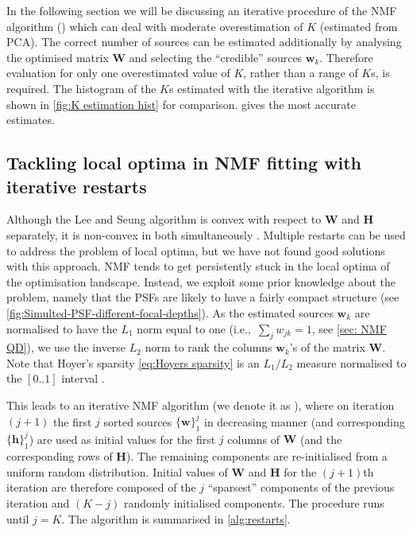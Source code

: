 In the following section we will be discussing an iterative procedure of the NMF algorithm (\inmf{}) which can deal with moderate overestimation of $K$  (estimated from PCA). The correct number of sources can be estimated additionally by analysing the optimised matrix $\bm{W}$ and selecting the ``credible'' sources $\bm{w}_k$. Therefore evaluation for only one overestimated value of $K$, rather than a range of $K$s, is required. The histogram of the $K$s estimated with the iterative algorithm is shown in  \autoref{fig:K estimation hist}\ddd{} for comparison. \inmf{} gives the most accurate estimates. 
\afterpage{\clearpage}

\subsection{Tackling local optima in NMF fitting with iterative restarts \label{sub: Iterative restarts}}

Although the Lee and Seung algorithm is convex with respect to $\bm{W}$ and $\bm{H}$ separately, it is non-convex in both simultaneously \cite{Lee2001}. Multiple restarts can be used to address the problem of local optima, but we have not found good solutions with this approach. NMF tends to get persistently stuck in the local optima of the optimisation landscape. Instead, we exploit some prior knowledge about the problem, namely that the PSFs are likely to have a fairly compact structure (see \autoref{fig:Simulted-PSF-different-focal-depths}). As the estimated sources $\bm{w}_k$ are normalised to have the $L_1$ norm equal to one (i.e.,\ $\sum_j w_{jk}=1$, see \autoref{sec: NMF QD}), we use the inverse $L_2$ norm to rank the columns $\bm{w}_k$'s of the matrix $\bm{W}$. Note that Hoyer's sparsity \autoref{eq:Hoyers sparsity} is an $L_1/L_2$ measure normalised to the $[0..1]$ interval \cite{Kim2008}. 

This leads to an iterative NMF algorithm (we denote it as \inmf{}), where on iteration $(j+1)$ the first $j$ sorted sources $\{ \bm{w} \}_1^j$ in decreasing manner (and corresponding $\{ \bm{h} \}_1^j$) are used as initial values for the first $j$ columns of $\bm{W}$ (and the corresponding rows of $\bm{H}$). The remaining components are re-initialised from a uniform random distribution. Initial values of $\bm{W}$ and $\bm{H}$ for the $(j+1)$th iteration are therefore composed of the $j$ ``sparsest'' components of the previous iteration and $(K-j)$ randomly initialised components. The procedure runs until $j=K$. The \inmf{} algorithm is summarised in \autoref{alg:restarts}. 


